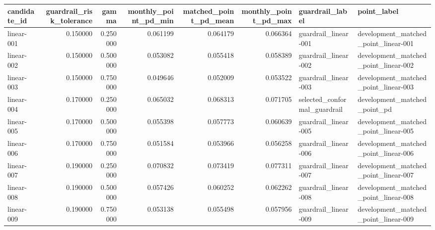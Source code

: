 \begin{tabular}{lrrrrrll}
\toprule
candidate\_id & guardrail\_risk\_tolerance & gamma & monthly\_point\_pd\_min & matched\_point\_pd\_mean & monthly\_point\_pd\_max & guardrail\_label & point\_label \\
\midrule
linear-001 & 0.150000 & 0.250000 & 0.061199 & 0.064179 & 0.066364 & guardrail\_linear-001 & development\_matched\_point\_linear-001 \\
linear-002 & 0.150000 & 0.500000 & 0.053082 & 0.055418 & 0.058389 & guardrail\_linear-002 & development\_matched\_point\_linear-002 \\
linear-003 & 0.150000 & 0.750000 & 0.049646 & 0.052009 & 0.053522 & guardrail\_linear-003 & development\_matched\_point\_linear-003 \\
linear-004 & 0.170000 & 0.250000 & 0.065032 & 0.068313 & 0.071705 & selected\_conformal\_guardrail & development\_matched\_point\_pd \\
linear-005 & 0.170000 & 0.500000 & 0.055398 & 0.057773 & 0.060639 & guardrail\_linear-005 & development\_matched\_point\_linear-005 \\
linear-006 & 0.170000 & 0.750000 & 0.051584 & 0.053966 & 0.056258 & guardrail\_linear-006 & development\_matched\_point\_linear-006 \\
linear-007 & 0.190000 & 0.250000 & 0.070832 & 0.073419 & 0.077311 & guardrail\_linear-007 & development\_matched\_point\_linear-007 \\
linear-008 & 0.190000 & 0.500000 & 0.057426 & 0.060252 & 0.062262 & guardrail\_linear-008 & development\_matched\_point\_linear-008 \\
linear-009 & 0.190000 & 0.750000 & 0.053138 & 0.055498 & 0.057956 & guardrail\_linear-009 & development\_matched\_point\_linear-009 \\
\bottomrule
\end{tabular}

